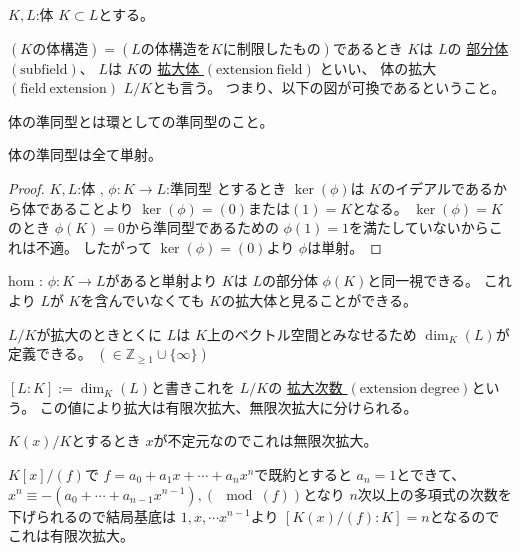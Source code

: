 \documentclass[../master_galois_theory]{subfiles}
\begin{document}
\begin{defi}
  $K , L$:体 $K \subset L$とする。

  $(Kの体構造) = (Lの体構造をKに制限したもの)$であるとき
  $K$は $L$の \underline{部分体 $(\mathrm{subfield})$}、
  $L$は $K$の \underline{拡大体 $(\mathrm{extension \  field})$}
  といい、
  体の拡大 $(\mathrm{field \  extension})$ $L/K$とも言う。
  つまり、以下の図が可換であるということ。


\end{defi}

\begin{defi}
  体の準同型とは環としての準同型のこと。
\end{defi}

\begin{note}
  体の準同型は全て単射。
\end{note}
\begin{proof}
  $K , L$:体 , $\phi : K \longrightarrow L$:準同型
  とするとき $\ker (\phi)$は $K$のイデアルであるから体であることより
  $\ker (\phi) = (0) または (1) = K$となる。
  $\ker (\phi) = K$のとき $\phi(K) = 0$から準同型であるための $\phi(1) = 1$を満たしていないからこれは不適。
  したがって $\ker (\phi) = (0)$より $\phi$は単射。
\end{proof}

  hom : $\phi : K \longrightarrow L$があると単射より $K$は $L$の部分体 $\phi(K)$と同一視できる。
  これより $L$が $K$を含んでいなくても $K$の拡大体と見ることができる。

  $L/K$が拡大のときとくに $L$は $K$上のベクトル空間とみなせるため $\dim_K(L)$が定義できる。 $(\in \mathbb{Z}_{\geq 1} \cup \{ \infty \})$

  \begin{defi}
    $[L:K] := \dim_K(L)$と書きこれを $L/K$の \underline{拡大次数 $(\mathrm{extension \  degree})$}という。
    この値により拡大は有限次拡大、無限次拡大に分けられる。
  \end{defi}

  \begin{exam}
    $K(x)/K$とするとき $x$が不定元なのでこれは無限次拡大。

    $K[x]/(f)$で $f = a_0 + a_1 x + \cdots + a_n x^n$で既約とすると
    $a_n = 1$とできて、 $x^n \equiv -(a_0 + \cdots + a_{n-1} x^{n-1}) , (\mod (f))$となり
    $n$次以上の多項式の次数を下げられるので結局基底は $1 , x , \cdots x^{n-1}$より $[K(x)/(f) : K] = n$となるのでこれは有限次拡大。
  \end{exam}
\end{document}
